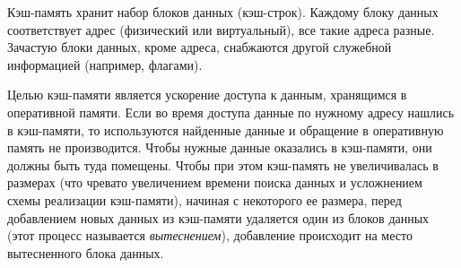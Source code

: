 
Кэш-память хранит набор блоков данных (кэш-строк). Каждому блоку данных соответствует адрес (физический или виртуальный), все такие адреса разные. Зачастую блоки данных, кроме адреса, снабжаются другой служебной информацией (например, флагами).

Целью кэш-памяти является ускорение доступа к данным, хранящимся в оперативной памяти. Если во время доступа данные по нужному адресу нашлись в кэш-памяти, то используются найденные данные и обращение в оперативную память не производится. Чтобы нужные данные оказались в кэш-памяти, они должны быть туда помещены. Чтобы при этом кэш-память не увеличивалась в размерах (что чревато увеличением времени поиска данных и усложнением схемы реализации кэш-памяти), начиная с некоторого ее размера, перед добавлением новых данных из кэш-памяти удаляется один из блоков данных (этот процесс называется \emph{вытеснением}), добавление происходит на место вытесненного блока данных.


